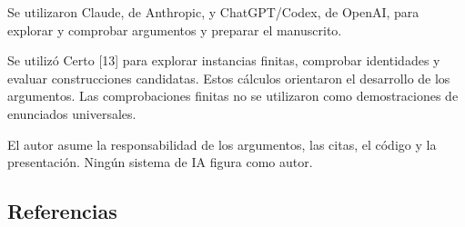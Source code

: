 \documentclass[spanish,11pt,a4paper]{article}
\begin{document}
Se utilizaron Claude, de Anthropic, y ChatGPT/Codex, de OpenAI, para explorar y comprobar argumentos y preparar el manuscrito.

Se utilizó Certo {[}13{]} para explorar instancias finitas, comprobar identidades y evaluar construcciones candidatas. Estos cálculos orientaron el desarrollo de los argumentos. Las comprobaciones finitas no se utilizaron como demostraciones de enunciados universales.

El autor asume la responsabilidad de los argumentos, las citas, el código y la presentación. Ningún sistema de IA figura como autor.

\subsection{Referencias}\label{referencias}
\end{document}
